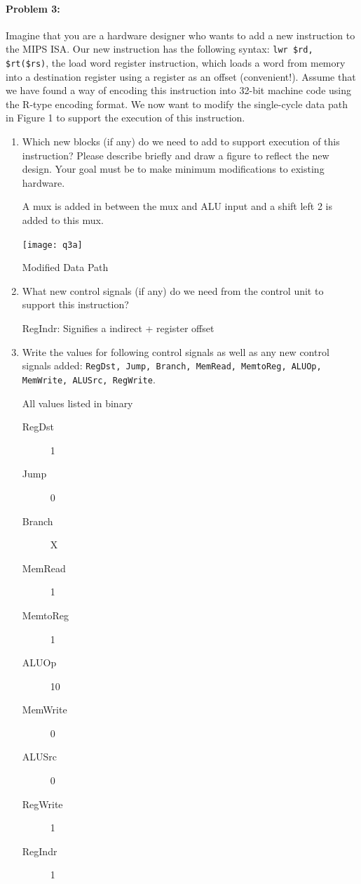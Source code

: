\documentclass[12pt,letterpaper,titlepage]{article}
\begin{document}
\begin{raggedright}
\paragraph{Problem 3: }
Imagine that you are a hardware designer who wants to add a new instruction to the MIPS ISA. Our new instruction has the following syntax: \texttt{lwr \$rd, \$rt(\$rs)}, the load word register instruction, which loads a word from memory into a destination register using a register as an offset (convenient!). Assume that we have found a way of encoding this instruction into 32-bit machine code using the R-type encoding format. We now want to modify the single-cycle data path in Figure 1 to support the execution of this instruction.

\begin{enumerate}
\item
Which new blocks (if any) do we need to add to support execution of this instruction? Please describe briefly and draw a figure to reflect the new design. Your goal must be to make minimum modifications to existing hardware.

A mux is added in between the mux and ALU input and a shift left 2 is added to this mux.

\begin{center}
\texttt{[image: q3a]}

Modified Data Path
\end{center}


\pagebreak
\item
What new control signals (if any) do we need from the control unit to support this instruction?

RegIndr: Signifies a indirect + register offset

\item
Write the values for following control signals as well as any new control signals added: \texttt{RegDst, Jump, Branch, MemRead, MemtoReg, ALUOp, MemWrite, ALUSrc, RegWrite}.

All values listed in binary

\begin{description}
\item[RegDst] 1
\item[Jump] 0
\item[Branch] X
\item[MemRead] 1
\item[MemtoReg] 1
\item[ALUOp] 10 %
\item[MemWrite] 0
\item[ALUSrc] 0
\item[RegWrite] 1
\item[RegIndr] 1
\end{description}


\end{enumerate}
\end{raggedright}
\end{document}
